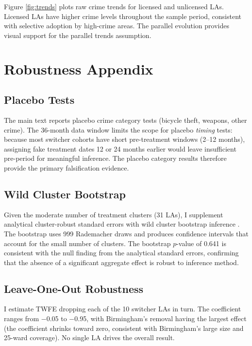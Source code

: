 \documentclass[12pt]{article}
\begin{document}
Figure \ref{fig:trends} plots raw crime trends for licensed and unlicensed LAs. Licensed LAs have higher crime levels throughout the sample period, consistent with selective adoption by high-crime areas. The parallel evolution provides visual support for the parallel trends assumption.


\section{Robustness Appendix}

\subsection{Placebo Tests}

The main text reports placebo crime category tests (bicycle theft, weapons, other crime). The 36-month data window limits the scope for placebo \emph{timing} tests: because most switcher cohorts have short pre-treatment windows (2--12 months), assigning fake treatment dates 12 or 24 months earlier would leave insufficient pre-period for meaningful inference. The placebo category results therefore provide the primary falsification evidence.

\subsection{Wild Cluster Bootstrap}

Given the moderate number of treatment clusters (31 LAs), I supplement analytical cluster-robust standard errors with wild cluster bootstrap inference \citep{cameron2015}. The bootstrap uses 999 Rademacher draws and produces confidence intervals that account for the small number of clusters. The bootstrap $p$-value of 0.641 is consistent with the null finding from the analytical standard errors, confirming that the absence of a significant aggregate effect is robust to inference method.

\subsection{Leave-One-Out Robustness}

I estimate TWFE dropping each of the 10 switcher LAs in turn. The coefficient ranges from $-$0.05 to $-$0.95, with Birmingham's removal having the largest effect (the coefficient shrinks toward zero, consistent with Birmingham's large size and 25-ward coverage). No single LA drives the overall result.
\end{document}

